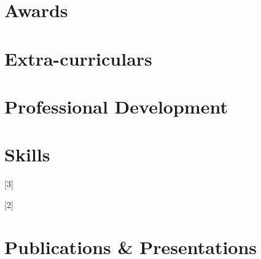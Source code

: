 \documentclass{resume} %
\begin{document}
\section{Awards}

\section{Extra-curriculars}

\section{Professional Development}

\section{Skills}

[3]

[2]


\section{Publications \& Presentations}

\footer

\end{document}
